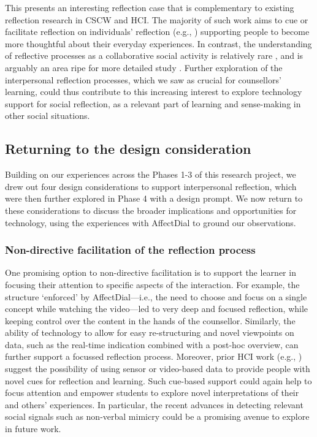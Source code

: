 \documentclass{sigchi}
\begin{document}
This presents an interesting reflection case that is complementary to  existing reflection research in CSCW and HCI. The majority of such work aims to cue or facilitate reflection on individuals' reflection (e.g., \cite{Sas2011,Stahl2008,Thieme2011,Isaacs2013}) supporting people to become more thoughtful about their everyday experiences. In contrast, the understanding of reflective processes as a collaborative social activity is relatively rare \cite{Fleck2012,Prilla2012}, and is arguably an area ripe for more detailed study \cite{Baumer2014}. Further exploration of the interpersonal reflection processes, which we saw as crucial for counsellors' learning, could thus contribute to this increasing interest to explore technology support for social reflection, as a relevant part of learning and sense-making in other social situations.

\subsection{Returning to the design consideration} 
Building on our experiences across the Phases 1-3 of this research project, we drew out four design considerations to support interpersonal reflection, which were then further explored in Phase 4 with a design prompt. We now return to these considerations to discuss the broader implications and opportunities for technology, using the experiences with AffectDial to ground our observations. 

\subsubsection{Non-directive facilitation of the reflection process}
One promising option to non-directive facilitation is to support the learner in focusing their attention to specific aspects of the interaction. For example, the structure `enforced' by AffectDial---i.e., the need to choose and focus on a single concept while watching the video---led to very deep and focused reflection, while keeping control over the content in the hands of the counsellor.  Similarly, the ability of technology to allow for easy re-structuring and novel viewpoints on data, such as the real-time indication combined with a post-hoc overview, can further support a focussed reflection process. 
Moreover, prior HCI work (e.g., \cite{McDuff2012,Stahl2008}) suggest the possibility of using sensor or video-based data to provide people with novel cues for reflection and learning. Such cue-based support could again help to focus attention and empower students to explore novel interpretations of their and others' experiences. In particular, the recent advances in detecting relevant social signals such as non-verbal mimicry \cite{Bilakhia2013,Vinciarelli2012} could be a promising avenue to explore in future work.
\end{document}
